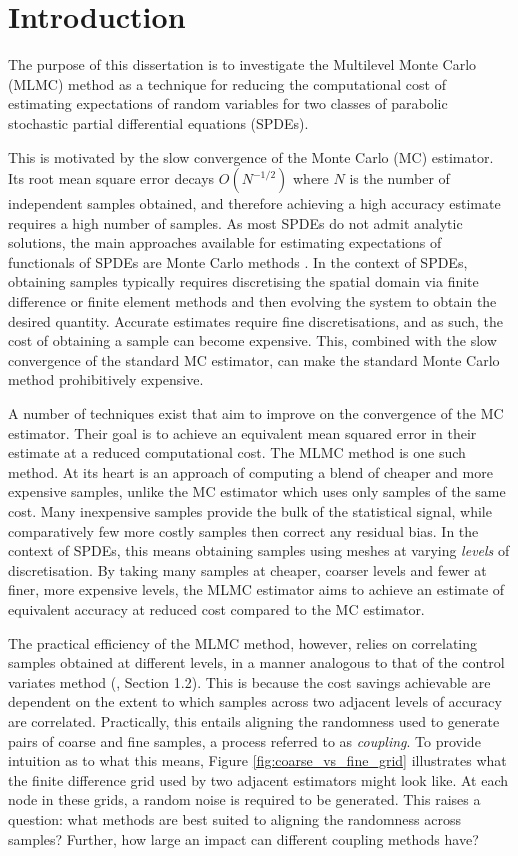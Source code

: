 \chapter{Introduction}\label{sec:intro}

The purpose of this dissertation is to investigate the 
Multilevel Monte Carlo (MLMC) method as a technique for reducing 
the computational cost of estimating expectations of random variables 
for two classes of parabolic stochastic partial differential equations (SPDEs).

This is motivated by the slow convergence of the Monte Carlo 
(MC) estimator. Its root mean square error 
decays $O(N^{-1/2})$ where $N$ is the number 
of independent samples obtained, and therefore achieving a high accuracy 
estimate requires a high number of samples. As most SPDEs do not admit 
analytic solutions, the main approaches available for estimating expectations of 
functionals of SPDEs are Monte Carlo methods \cite{giles2015multilevel}. In the context
of SPDEs, obtaining samples typically requires discretising 
the spatial domain via finite difference or finite element methods
and then evolving the system to obtain the desired quantity. Accurate 
estimates require fine discretisations, and as such, the cost of obtaining 
a sample can become expensive. This, combined with the slow convergence of the 
standard MC estimator, can make the standard Monte Carlo method prohibitively
expensive.

A number of techniques exist that aim to improve on the convergence of 
the MC estimator. Their goal is to achieve an equivalent mean squared error
in their estimate at a reduced computational cost. The MLMC method is one 
such method. At its heart is an approach of computing a blend of cheaper 
and more expensive samples, unlike the MC estimator which uses only samples 
of the same cost. Many inexpensive samples provide the bulk of the statistical signal, 
while comparatively few more costly samples then correct any residual bias.
In the context of SPDEs, this means obtaining samples using meshes at 
varying \textit{levels} of discretisation. By taking many samples at cheaper,
coarser levels and fewer at finer, more expensive levels, the MLMC 
estimator aims to achieve an estimate of equivalent accuracy at reduced cost
compared to the MC estimator.

The practical efficiency of the MLMC method, however, relies on correlating 
samples obtained at different levels, in a manner analogous to that of the 
control variates method (\cite{giles2015multilevel}, Section 1.2). 
This is because the cost savings achievable are dependent on the extent to which 
samples across two adjacent levels of accuracy are correlated. Practically, this 
entails aligning the randomness used to generate pairs of coarse and 
fine samples, a process referred to as \textit{coupling}.
To provide intuition as to what this means, Figure
\ref{fig:coarse_vs_fine_grid} illustrates what the finite difference 
grid used by two adjacent estimators might look like. At each 
node in these grids, a random noise is required to be generated. 
This raises a question: what methods are best suited to aligning the 
randomness across samples? Further, how large an impact 
can different coupling methods have?


